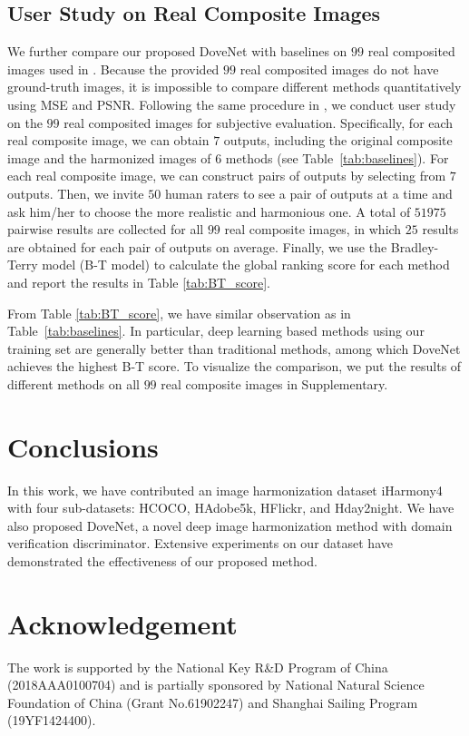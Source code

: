 \documentclass[10pt,twocolumn,letterpaper]{article}
\begin{document}
\subsection{User Study on Real Composite Images}
We further compare our proposed DoveNet with baselines on $99$ real composited images used in \cite{tsai2017deep}. Because the provided $99$ real composited images do not have ground-truth images, it is impossible to compare different methods quantitatively using MSE and PSNR. Following the same procedure in \cite{tsai2017deep}, we conduct user study on the $99$ real composited images for subjective evaluation. Specifically, for each real composite image, we can obtain $7$ outputs, including the original composite image and the harmonized images of $6$ methods (see Table~\ref{tab:baselines}). For each real composite image, we can construct pairs of outputs by selecting from $7$ outputs. Then, we invite $50$ human raters to see a pair of outputs at a time and ask him/her to choose the more realistic and harmonious one. A total of $51975$ pairwise results are collected for all $99$ real composite images, in which $25$ results are obtained for each pair of outputs on average. Finally, we use the Bradley-Terry model (B-T model) \cite{bradley1952rank, lai2016comparative} to calculate the global ranking score for each method and report the results in Table \ref{tab:BT_score}.

From Table \ref{tab:BT_score}, we have similar observation as in Table~\ref{tab:baselines}. In particular, deep learning based methods using our training set are generally better than traditional methods, among which DoveNet achieves the highest B-T score. To visualize the comparison, we put the results of different methods on all $99$ real composite images in Supplementary.


\section{Conclusions}
In this work, we have contributed an image harmonization dataset iHarmony4 with four sub-datasets: HCOCO, HAdobe5k, HFlickr, and Hday2night. We have also proposed DoveNet, a novel deep image harmonization method with domain verification discriminator. Extensive experiments on our dataset have demonstrated the effectiveness of our proposed method.

\section*{Acknowledgement}
The work is supported by the National Key R\&D Program of China (2018AAA0100704) and is partially sponsored by National Natural Science Foundation of China (Grant No.61902247) and Shanghai Sailing Program (19YF1424400).
\end{document}
